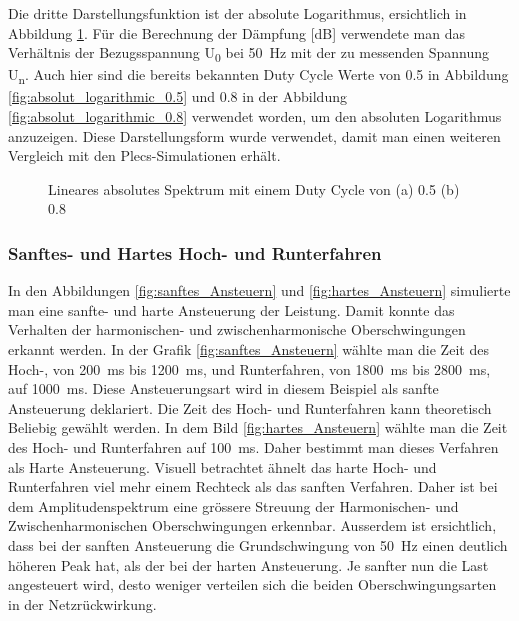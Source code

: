 Die dritte Darstellungsfunktion ist der absolute Logarithmus, ersichtlich in Abbildung \ref{fig:absolut_logaritmic_matlab}. Für die Berechnung der Dämpfung [dB] verwendete man das Verhältnis der Bezugsspannung U\textsubscript{0} bei \SI{50}{Hz} mit der zu messenden Spannung U\textsubscript{n}. Auch hier sind die bereits bekannten Duty Cycle Werte von 0.5 in Abbildung  \ref{fig:absolut_logarithmic_0.5} und 0.8 in der Abbildung \ref{fig:absolut_logarithmic_0.8} verwendet worden, um den absoluten Logarithmus anzuzeigen. Diese Darstellungsform  wurde verwendet, damit man einen weiteren Vergleich mit den Plecs-Simulationen erhält.


\begin{figure}[ht!]
	\centering
	\qquad
	\caption{Lineares absolutes Spektrum mit einem Duty Cycle von (a) 0.5 (b) 0.8}
	\label{fig:absolut_logaritmic_matlab}
\end{figure}

\subsubsection{Sanftes- und Hartes Hoch- und Runterfahren}\label{sec:sanftes_hoch_und_runterfahren}

In den Abbildungen \ref{fig:sanftes_Ansteuern} und \ref{fig:hartes_Ansteuern} simulierte man eine sanfte- und harte Ansteuerung der Leistung. Damit konnte das Verhalten der harmonischen- und zwischenharmonische Oberschwingungen erkannt werden. In der Grafik \ref{fig:sanftes_Ansteuern} wählte man die Zeit des Hoch-, von \SI{200}{ms} bis \SI{1200}{ms}, und Runterfahren, von \SI{1800}{ms} bis \SI{2800}{ms}, auf \SI{1000}{ms}. Diese Ansteuerungsart wird in diesem Beispiel als sanfte Ansteuerung deklariert. Die Zeit des Hoch- und Runterfahren kann theoretisch Beliebig gewählt werden. In dem Bild \ref{fig:hartes_Ansteuern} wählte man die Zeit des Hoch- und Runterfahren auf \SI{100}{ms}. Daher bestimmt man dieses Verfahren als Harte Ansteuerung. Visuell betrachtet ähnelt das harte Hoch- und Runterfahren viel mehr einem Rechteck als das sanften Verfahren. Daher ist bei dem Amplitudenspektrum eine grössere Streuung der Harmonischen- und Zwischenharmonischen Oberschwingungen erkennbar. Ausserdem ist ersichtlich, dass bei der sanften Ansteuerung die Grundschwingung von \SI{50}{Hz} einen deutlich höheren Peak hat, als der bei der harten Ansteuerung. Je sanfter nun die Last angesteuert wird, desto weniger verteilen sich die beiden Oberschwingungsarten in der Netzrückwirkung.


